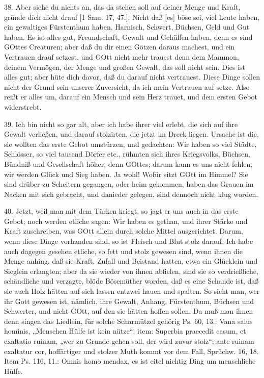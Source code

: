 38. Aber siehe du nichts an, das da stehen soll auf deiner Menge und Kraft, gründe dich nicht drauf [1 Sam. 17, 47.]. Nicht daß [es] böse sei, viel Leute haben, ein gewaltiges Fürstenthum haben, Harnisch, Schwert, Büchsen, Geld und Gut haben. Es ist alles gut, Freundschaft, Gewalt und Gehülfen haben, denn es sind GOttes Creaturen; aber daß du dir einen Götzen daraus machest, und ein Vertrauen drauf setzest, und GOtt nicht mehr trauest denn dem Mammon, deinem Vermögen, der Menge und großen Gewalt, das soll nicht sein. Dies ist alles gut; aber hüte dich davor, daß du darauf nicht vertrauest. Diese Dinge sollen nicht der Grund sein unserer Zuversicht, da ich mein Vertrauen auf setze. Also reißt er alles um, darauf ein Mensch und sein Herz trauet, und dem ersten Gebot widerstrebt.

39. Ich bin nicht so gar alt, aber ich habe ihrer viel erlebt, die sich auf ihre Gewalt verließen, und darauf stolzirten, die jetzt im Dreck liegen. Ursache ist die, sie wollten das erste Gebot umstürzen, und gedachten: Wir haben so viel Städte, Schlösser, so viel tausend Dörfer etc., rühmten sich ihres Kriegsvolks, Büchsen, Bündniß und Gesellschaft höher, denn GOttes; darum kann es uns nicht fehlen, wir werden Glück und Sieg haben. Ja wohl! Wofür sitzt GOtt im Himmel? Sie sind drüber zu Scheitern gegangen, oder heim gekommen, haben das Grauen im Nacken mit sich gebracht, und danieder gelegen, sind dennoch nicht klug worden.

40. Jetzt, weil man mit dem Türken kriegt, so jagt er uns auch in das erste Gebot; noch werden etliche sagen: Wir haben es gethan, und ihrer Stärke und Kraft zuschreiben, was GOtt allein durch solche Mittel ausgerichtet. Darum, wenn diese Dinge vorhanden sind, so ist Fleisch und Blut stolz darauf. Ich habe auch dagegen gesehen etliche, so fett und stolz gewesen sind, wenn ihnen die Menge anhing, daß sie Kraft, Zufall und Beistand hatten, etwa ein Glücklein und Sieglein erlangten; aber da sie wieder von ihnen abfielen, sind sie so verdrießliche, schändliche und verzagte, blöde Bösemüther worden, daß es eine Schande ist, daß sie auch Holz hätten auf sich lassen entzwei hauen und spalten. So sieht man, wer ihr Gott gewesen
ist, nämlich, ihre Gewalt, Anhang, Fürstenthum, Büchsen und Schwerter, und nicht GOtt, auf den sie hätten hoffen sollen. Da muß man ihnen denn singen das Liedlein, für solche Scharmützel gehörig Ps. 60, 13.: Vana salus hominis, „Menschen Hülfe ist kein nütze“; item: Superbia praecedit casum, et exaltatio ruinam, „wer zu Grunde gehen soll, der wird zuvor stolz“; ante ruinam exaltatur cor, hoffärtiger und stolzer Muth kommt vor dem Fall, Sprüchw. 16, 18. Item Ps. 116, 11.: Omnis homo mendax, es ist eitel nichtig Ding um menschliche Hülfe.

